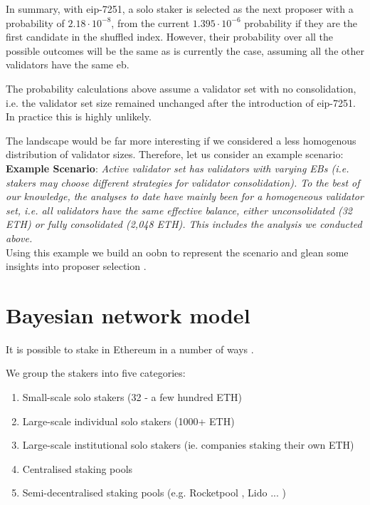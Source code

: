 \documentclass[submission,copyright,creativecommons]{eptcs}
\begin{document}
In summary, with \gls{eip}-7251, a solo staker is selected as the
next proposer with a probability of $2.18\cdot 10^{-8}$, from the current $1.395 \cdot 
10^{-6}$ probability if they are the first candidate in the shuffled index.
However, their probability over all the possible outcomes will be the same as
is currently the case, assuming all the other validators have the same \gls{eb}.

The probability calculations above assume a validator set with no
consolidation, i.e. the validator set size remained unchanged after the
introduction of \gls{eip}-7251. In practice this is highly unlikely. 

The landscape would be far more interesting if we considered a less homogenous distribution of validator sizes.
Therefore, let us consider an example scenario:\\

\noindent
\textbf{Example Scenario}: \emph{Active validator set has validators with
    varying EBs (i.e. stakers may choose different strategies for validator
    consolidation). To the best of our knowledge, the analyses to date have
    mainly been for a homogeneous validator set, i.e. all validators have the
    same effective balance, either unconsolidated (32 ETH) or fully
    consolidated (2,048 ETH). This includes the analysis we conducted above.}\\

Using this example we build an \gls{oobn} to represent the scenario and glean some insights into proposer selection \cite{KjaerulffMadsen2013}.

\section{Bayesian network model}
\label{sec:results}
It is possible to stake in Ethereum in a number of ways \cite{breslina, efstaking, efpools, efsaas, efsolo}. 

We group the stakers into five categories:
\begin{enumerate}[noitemsep]
\item Small-scale solo stakers (32 - a few hundred ETH)
\item Large-scale individual solo stakers (1000+ ETH)
\item Large-scale institutional solo stakers (ie. companies staking their own ETH)
\item Centralised staking pools
\item Semi-decentralised staking pools (e.g. Rocketpool \cite{RocketPool2023}, Lido \cite{lidodoc}... )
\end{enumerate}
\end{document}
